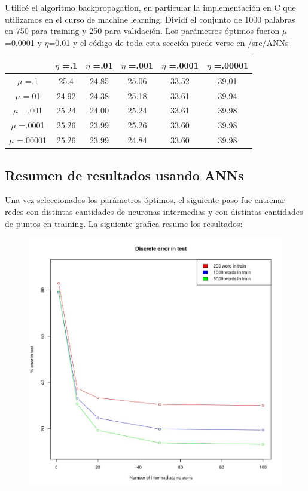 \documentclass[paper=a4, fontsize=11pt]{scrartcl} %
\numberwithin{equation}{section} %
\numberwithin{figure}{section} %
\numberwithin{table}{section} %
\begin{document}
Utilicé el algoritmo backpropagation, en particular la implementación en C que utilizamos en el curso de machine learning. Dividí el conjunto de 1000 palabras en 750 para training y 250 para validación. Los parámetros óptimos fueron $\mu$=0.0001 y $\eta$=0.01 y el código de toda esta sección puede verse en /src/ANNs

\begin{center}
\begin{tabular}{ |c|c|c|c|c|c|  }
\hline
 & $\eta$ =.1 & $\eta$ =.01 & $\eta$ =.001 & $\eta$ =.0001 & $\eta$ =.00001 \\
\hline 
$\mu$ =.1     & 25.4  & 24.85 & 25.06 & 33.52 & 39.01 \\
$\mu$ =.01    & 24.92 & 24.38 & 25.18 & 33.61 & 39.94 \\
$\mu$ =.001   & 25.24 & 24.00 & 25.24 & 33.61 & 39.98 \\
$\mu$ =.0001  & 25.26 & 23.99 & 25.26 & 33.60 & 39.98 \\
$\mu$ =.00001 & 25.26 & 23.99 & 24.84 & 33.60 & 39.98 \\

\hline
\end{tabular}
\end{center}

\subsection{Resumen de resultados usando ANNs}
Una vez seleccionados los parámetros óptimos, el siguiente paso fue entrenar redes con distintas cantidades de neuronas intermedias y con distintas cantidades de puntos en training. La siguiente grafica resume los resultados:



\begin{figure}[h!]
\centering
\includegraphics[width=130mm]{annresults.jpg}
\end{figure}
\end{document}
